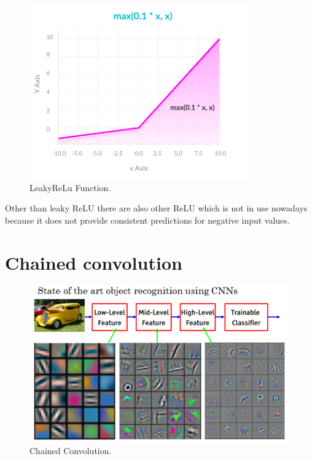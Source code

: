 \documentclass[a4paper,13pt,twoside]{book}
\begin{document}
\begin{figure}[H]
  \includegraphics[width=\linewidth]{Images/LeakyReLu.png}
  \caption{LeakyReLu Function.}
  \label{fig:LeakyReLu Function}
\end{figure}

Other than leaky ReLU there are also other ReLU which is not in use nowadays because it does not provide consistent predictions for negative input values.

\section{Chained convolution}

\begin{figure}[H]
  \includegraphics[width=\linewidth]{Images/chainedconvoluion(17).png}
  \caption{Chained Convolution.}
  \label{fig:Chained Convolution}
\end{figure}
\end{document}
